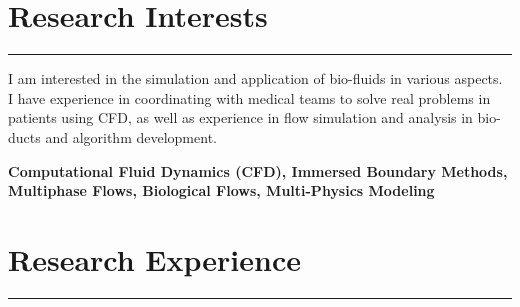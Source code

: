 \documentclass[10pt]{article} %
\begin{document}
\section*{Research Interests}
\hrule

I am interested in the simulation and application of bio-fluids in various aspects. I have experience in coordinating with medical teams to solve real problems in patients using CFD, as well as experience in flow simulation and analysis in bio-ducts and algorithm development.


\small\textbf{Computational Fluid Dynamics (CFD), Immersed Boundary Methods, Multiphase Flows, Biological Flows,  Multi-Physics Modeling}

\vspace{2mm}

\section*{Research Experience}
\hrule
\end{document}
